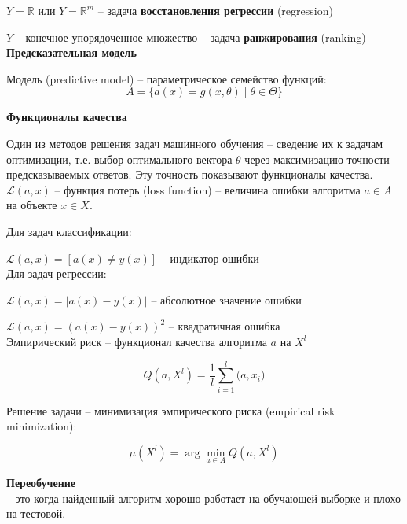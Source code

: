 \documentclass{article}
\begin{document}
    $Y = \mathbb{R}$ или $Y = \mathbb{R}^m$ -- задача \textbf{восстановления регрессии} (regression)

    $Y$ -- конечное упорядоченное множество -- задача \textbf{ранжирования} (ranking)\\
    
    \textbf{Предсказательная модель}
    
    Модель (predictive model) -- параметрическое семейство функций:
    \begin{equation}
        A = \{a(x)=g(x,\theta)\; |\; \theta\in\Theta\}
    \end{equation}
    
    \textbf{Функционалы качества}
    
    Один из методов решения задач машинного обучения -- сведение их к задачам оптимизации, т.е. выбор оптимального вектора $\theta$ через максимизацию точности предсказываемых ответов. Эту точность показывают функционалы качества.\\
    
    $\mathcal{L}(a,x)$ -- функция потерь (loss function) -- величина ошибки алгоритма $a\in A$ на объекте $x\in X$.
    
    Для задач классификации:
    
    $\mathcal{L}(a,x) = [a(x)\neq y(x)]$ -- индикатор ошибки\\
    
    Для задач регрессии:
    
    $\mathcal{L}(a,x) = |a(x)-y(x)|$ -- абсолютное значение ошибки
    
    $\mathcal{L}(a,x) = (a(x)-y(x))^2$ -- квадратичная ошибка\\
    
    Эмпирический риск -- функционал качества алгоритма $a$ на $X^l$
    
    \begin{equation}
        Q(a,X^l) = \frac{1}{l}\sum_{i=1}^l \mathcal(a,x_i)
    \end{equation}
    
    Решение задачи -- минимизация эмпирического риска (empirical risk minimization):
    
    \begin{equation}
        \mu(X^l) = \arg \min_{a\in A} Q(a,X^l)
    \end{equation}
    
    \textbf{Переобучение}\\
    
    -- это когда найденный алгоритм хорошо работает на обучающей выборке и плохо на тестовой.\\
    
\end{document}
